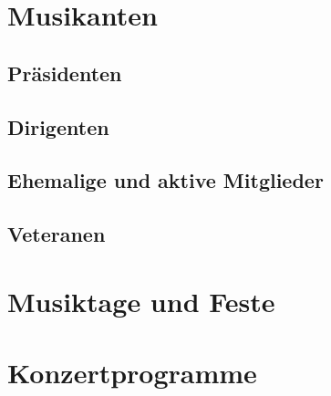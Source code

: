 \documentclass[]{book}
\begin{document}
\part{Musikanten}

\chapter{Präsidenten}


\chapter{Dirigenten}


\chapter{Ehemalige und aktive Mitglieder}


\chapter{Veteranen}




\part{Musiktage und Feste}








\part{Konzertprogramme}




% 

\backmatter
\end{document}
